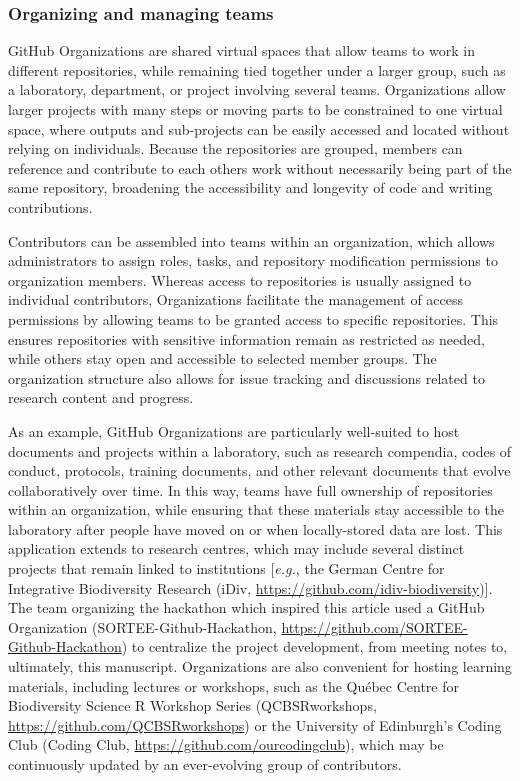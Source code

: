 \hypertarget{organizing-and-managing-teams}{%
\subsubsection{Organizing and managing teams}\label{organizing-and-managing-teams}}

GitHub Organizations are shared virtual spaces that allow teams to work in different repositories, while remaining tied together under a larger group, such as a laboratory, department, or project involving several teams.
Organizations allow larger projects with many steps or moving parts to be constrained to one virtual space, where outputs and sub-projects can be easily accessed and located without relying on individuals.
Because the repositories are grouped, members can reference and contribute to each others work without necessarily being part of the same repository, broadening the accessibility and longevity of code and writing contributions.

Contributors can be assembled into teams within an organization, which allows administrators to assign roles, tasks, and repository modification permissions to organization members.
Whereas access to repositories is usually assigned to individual contributors, Organizations facilitate the management of access permissions by allowing teams to be granted access to specific repositories.
This ensures repositories with sensitive information remain as restricted as needed, while others stay open and accessible to selected member groups.
The organization structure also allows for issue tracking and discussions related to research content and progress.

As an example, GitHub Organizations are particularly well-suited to host documents and projects within a laboratory, such as research compendia, codes of conduct, protocols, training documents, and other relevant documents that evolve collaboratively over time.
In this way, teams have full ownership of repositories within an organization, while ensuring that these materials stay accessible to the laboratory after people have moved on or when locally-stored data are lost.
This application extends to research centres, which may include several distinct projects that remain linked to institutions {[}\emph{e.g.}, the German Centre for Integrative Biodiversity Research (iDiv, \url{https://github.com/idiv-biodiversity}){]}.
The team organizing the hackathon which inspired this article used a GitHub Organization (SORTEE-Github-Hackathon, \url{https://github.com/SORTEE-Github-Hackathon}) to centralize the project development, from meeting notes to, ultimately, this manuscript.
Organizations are also convenient for hosting learning materials, including lectures or workshops, such as the Québec Centre for Biodiversity Science R Workshop Series (QCBSRworkshops, \url{https://github.com/QCBSRworkshops}) or the University of Edinburgh's Coding Club (Coding Club, \url{https://github.com/ourcodingclub}), which may be continuously updated by an ever-evolving group of contributors.

